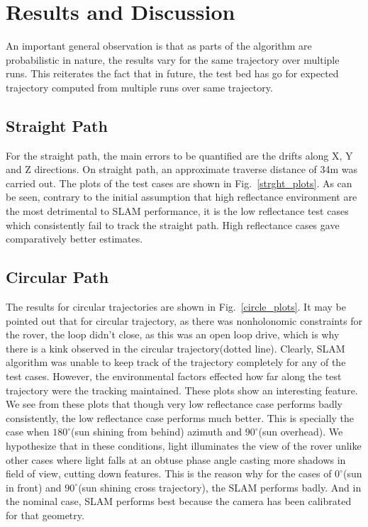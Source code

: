 \documentclass[a4paper, 10pt, conference]{ieeeconf}      %
\begin{document}
\section{Results and Discussion}
An important general observation is that as parts of the algorithm are probabilistic in nature, the results vary for the same trajectory over multiple runs. This reiterates the fact that in future, the test bed has go for expected trajectory computed from multiple runs over same trajectory.
\subsection{Straight Path}
For the straight path, the main errors to be quantified are the drifts along X, Y and Z directions. On straight path, an approximate traverse distance of 34m was carried out.  The plots of the test cases are shown in Fig.~\ref{strght_plots}. As can be seen, contrary to the initial assumption that high reflectance environment are the most detrimental to SLAM performance, it is the low reflectance test cases which consistently fail to track the straight path. High reflectance cases gave comparatively better estimates.
\subsection{Circular Path}
The results for circular trajectories are shown in Fig.~\ref{circle_plots}. It may be pointed out that for circular trajectory, as there was nonholonomic constraints for the rover, the loop didn't close, as this was an open loop drive, which is why there is a kink observed in the circular trajectory(dotted line).
 Clearly, SLAM algorithm was unable to keep track of the trajectory completely for any of the test cases. However, the environmental factors effected how far along the test trajectory were the tracking maintained. These plots show an interesting feature. We see from these plots that though very low reflectance case performs badly consistently, the low reflectance case performs much better. This is specially the case when $180^\circ$(sun shining from behind) azimuth and $90^\circ$(sun overhead). We hypothesize that in these conditions, light illuminates the view of the rover unlike other cases where light falls at an obtuse phase angle casting more shadows in field of view, cutting down features. This is the reason why for the cases of $0^\circ$(sun in front) and $90^\circ$(sun shining cross trajectory), the SLAM performs badly. And in the nominal case, SLAM performs best because the camera has been calibrated for that geometry. 
\end{document}
